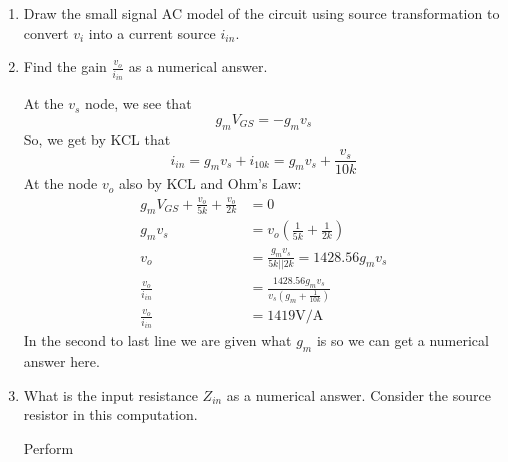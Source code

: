 \begin{enumerate}
    
    
    \begin{enumerate}
        \item Draw the small signal AC model of the circuit using source transformation to convert $v_i$ into a current source $i_{in}$.
        \begin{Ans}
            
        \end{Ans}

        \item Find the gain $\frac{v_o}{i_{in}}$ as a numerical answer.
        \begin{Ans}
            At the $v_s$ node, we see that 
                \[g_m V_{GS} = -g_m v_s\]
            So, we get by KCL that 
                \[i_{in} = g_m v_s + i_{10k} = g_m v_s + \frac{v_s}{10k}\]
            At the node $v_o$ also by KCL and Ohm's Law:
            \begin{align*}
                g_m V_{GS} + \frac{v_o}{5k} + \frac{v_o}{2k} &= 0 \\
                g_m v_s &= v_o (\frac{1}{5k} + \frac{1}{2k}) \\
                v_o &= \frac{g_m v_s}{5k || 2k} = 1428.56 g_m v_s \\
                \frac{v_o}{i_{in}} &= \frac{1428.56 g_m v_s}{v_s (g_m + \frac{1}{10k})} \\
                \frac{v_o}{i_{in}} &= 1419 \mathrm{V/A}
            \end{align*}
            In the second to last line we are given what $g_m$ is so we can get a numerical answer here.
        \end{Ans}

        \item What is the input resistance $Z_{in}$ as a numerical answer. Consider the source resistor in this computation.
        \begin{Ans}
            Perform 
        \end{Ans}
    \end{enumerate}
\end{enumerate}

